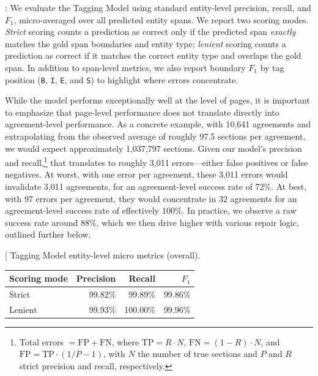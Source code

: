 \documentclass[12pt]{article}
\makeatletter
\DeclareRobustCommand{\caption}{%
  \@ifnextchar[%
    {\@captionwithopt}
    {\@captionwithoutopt}%
}
\newcommand{\@captionwithopt}[3][]{%
  \if\relax\detokenize{#3}\relax
    \caption@setopt{#1}%
    \caption@makecaption{\csname fnum@\@captype\endcsname}{}%
  \else
    \caption@setopt{#1}%
    \caption@makecaption{\csname fnum@\@captype\endcsname}{#3}%
  \fi
}
\newcommand{\@captionwithoutopt}[2]{%
  \@captionwithopt[]{#1}{#2}%
}
\makeatother
\begin{document}
\underline{}: We evaluate the Tagging Model using standard entity-level precision, recall, and \(F_1\), micro-averaged over all predicted entity spans. We report two scoring modes. \emph{Strict} scoring counts a prediction as correct only if the predicted span \emph{exactly} matches the gold span boundaries and entity type; \emph{lenient} scoring counts a prediction as correct if it matches the correct entity type and overlaps the gold span. In addition to span-level metrics, we also report boundary \(F_1\) by tag position (\texttt{B}, \texttt{I}, \texttt{E}, and \texttt{S}) to highlight where errors concentrate.

While the model performs exceptionally well at the level of pages, it is important to emphasize that page-level performance does not translate directly into agreement-level performance. As a concrete example, with 10,641 agreements and extrapolating from the observed average of roughly 97.5 sections per agreement, we would expect approximately 1,037,797 sections. Given our model's precision and recall,\footnote{Total errors \(= \mathrm{FP} + \mathrm{FN}\), where \(\mathrm{TP} = R \cdot N\), \(\mathrm{FN} = (1 - R) \cdot N\), and \(\mathrm{FP} = \mathrm{TP} \cdot (1/P - 1)\), with \(N\) the number of true sections and \(P\) and \(R\) strict precision and recall, respectively.} that translates to roughly 3,011 errors—either false positives or false negatives. At worst, with one error per agreement, these 3,011 errors would invalidate 3,011 agreements, for an agreement-level success rate of 72\%. At best, with 97 errors per agreement, they would concentrate in 32 agreements for an agreement-level success rate of effectively 100\%. In practice, we observe a raw success rate around 88\%, which we then drive higher with various repair logic, outlined further below.

\begin{table}[H]
\centering
\caption{Tagging Model entity-level micro metrics (overall).}
\label{tab:tagging-overall-micro}
\begin{tabular}{lrrr}
\toprule
Scoring mode & Precision & Recall & \(F_1\) \\
\midrule
Strict  & 99.82\% & 99.89\% & 99.86\% \\
Lenient & 99.93\% & 100.00\% & 99.96\% \\
\bottomrule
\end{tabular}
\end{table}
\end{document}
